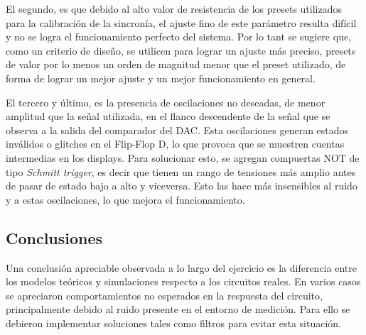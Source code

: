 El segundo, es que debido al alto valor de resistencia de los presets utilizados para la calibraci\'on de la sincron\'ia, el ajuste fino de este par\'ametro resulta dif\'icil y no se logra el funcionamiento perfecto del sistema. Por lo tant se sugiere que, como un criterio de dise\~no, se utilicen para lograr un ajuste m\'as preciso, presets de valor por lo menos un orden de magnitud menor que el preset utilizado, de forma de lograr un mejor ajuste y un mejor funcionamiento en general.

El tercero y \'ultimo, es la presencia de oscilaciones no deseadas, de menor amplitud que la se\~nal utilizada, en el flanco descendente de la se\~nal que se observa a la salida del comparador del DAC. Esta oscilaciones generan estados inv\'alidos o glitches en el Flip-Flop D, lo que provoca que se muestren cuentas intermedias en los displays. Para solucionar esto, se agregan compuertas NOT de tipo \textit{Schmitt trigger}, es decir que tienen un rango de tensiones m\'as amplio antes de pasar de estado bajo a alto y viceversa. Esto las hace m\'as insensibles al ruido y a estas oscilaciones, lo que mejora el funcionamiento.


\subsection{Conclusiones}
 Una conclusi\'on apreciable observada a lo largo del ejercicio es la diferencia entre los modelos te\'oricos y simulaciones respecto a los circuitos reales. En varios casos se apreciaron comportamientos no esperados en la respuesta del circuito, principalmente debido al ruido presente en el entorno de medici\'on. Para ello se debieron implementar soluciones tales como filtros para evitar esta situaci\'on.

